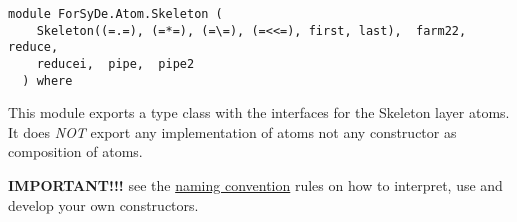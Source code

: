 \label{module:ForSyDe.Atom.Skeleton}
\haddockbeginheader
{\haddockverb\begin{verbatim}
module ForSyDe.Atom.Skeleton (
    Skeleton((=.=), (=*=), (=\=), (=<<=), first, last),  farm22,  reduce, 
    reducei,  pipe,  pipe2
  ) where\end{verbatim}}
\haddockendheader

This module exports a type class with the interfaces for the
 Skeleton layer atoms. It does \emph{NOT} export any implementation of
 atoms not any constructor as composition of atoms.\par
\textbf{IMPORTANT!!!}
 see the \href{ForSyDe-Atom.html#naming_conv}{naming convention} rules
 on how to interpret, use and develop your own constructors.\par

